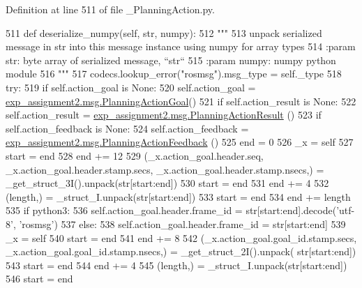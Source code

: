Definition at line 511 of file \+\_\+\+Planning\+Action.\+py.


\begin{DoxyCode}
511   \textcolor{keyword}{def }deserialize\_numpy(self, str, numpy):
512     \textcolor{stringliteral}{"""}
513 \textcolor{stringliteral}{    unpack serialized message in str into this message instance using numpy for array types}
514 \textcolor{stringliteral}{    :param str: byte array of serialized message, ``str``}
515 \textcolor{stringliteral}{    :param numpy: numpy python module}
516 \textcolor{stringliteral}{    """}
517     codecs.lookup\_error(\textcolor{stringliteral}{"rosmsg"}).msg\_type = self.\_type
518     \textcolor{keywordflow}{try}:
519       \textcolor{keywordflow}{if} self.action\_goal \textcolor{keywordflow}{is} \textcolor{keywordtype}{None}:
520         self.action\_goal = \hyperlink{classexp__assignment2_1_1msg_1_1__PlanningActionGoal_1_1PlanningActionGoal}{exp\_assignment2.msg.PlanningActionGoal}()
521       \textcolor{keywordflow}{if} self.action\_result \textcolor{keywordflow}{is} \textcolor{keywordtype}{None}:
522         self.action\_result = \hyperlink{classexp__assignment2_1_1msg_1_1__PlanningActionResult_1_1PlanningActionResult}{exp\_assignment2.msg.PlanningActionResult}
      ()
523       \textcolor{keywordflow}{if} self.action\_feedback \textcolor{keywordflow}{is} \textcolor{keywordtype}{None}:
524         self.action\_feedback = \hyperlink{classexp__assignment2_1_1msg_1_1__PlanningActionFeedback_1_1PlanningActionFeedback}{exp\_assignment2.msg.PlanningActionFeedback}
      ()
525       end = 0
526       \_x = self
527       start = end
528       end += 12
529       (\_x.action\_goal.header.seq, \_x.action\_goal.header.stamp.secs, \_x.action\_goal.header.stamp.nsecs,) = 
      \_get\_struct\_3I().unpack(str[start:end])
530       start = end
531       end += 4
532       (length,) = \_struct\_I.unpack(str[start:end])
533       start = end
534       end += length
535       \textcolor{keywordflow}{if} python3:
536         self.action\_goal.header.frame\_id = str[start:end].decode(\textcolor{stringliteral}{'utf-8'}, \textcolor{stringliteral}{'rosmsg'})
537       \textcolor{keywordflow}{else}:
538         self.action\_goal.header.frame\_id = str[start:end]
539       \_x = self
540       start = end
541       end += 8
542       (\_x.action\_goal.goal\_id.stamp.secs, \_x.action\_goal.goal\_id.stamp.nsecs,) = \_get\_struct\_2I().unpack(
      str[start:end])
543       start = end
544       end += 4
545       (length,) = \_struct\_I.unpack(str[start:end])
546       start = end

\end{DoxyCode}
